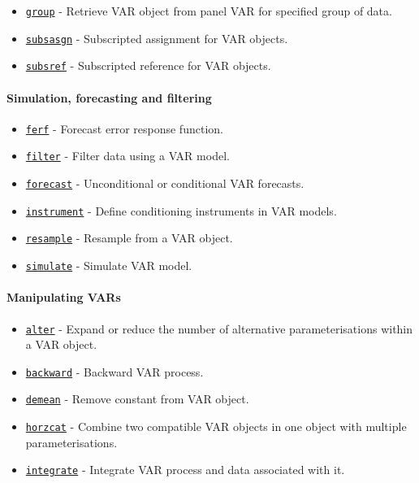 \begin{itemize}
\itemsep1pt\parskip0pt
\item
  \href{VAR/group}{\texttt{group}} - Retrieve VAR object from panel VAR
  for specified group of data.
\item
  \href{VAR/subsasgn}{\texttt{subsasgn}} - Subscripted assignment for
  VAR objects.
\item
  \href{VAR/subsref}{\texttt{subsref}} - Subscripted reference for VAR
  objects.
\end{itemize}

\paragraph{Simulation, forecasting and
filtering}\label{simulation-forecasting-and-filtering}

\begin{itemize}
\itemsep1pt\parskip0pt
\item
  \href{VAR/ferf}{\texttt{ferf}} - Forecast error response function.
\item
  \href{VAR/filter}{\texttt{filter}} - Filter data using a VAR model.
\item
  \href{VAR/forecast}{\texttt{forecast}} - Unconditional or conditional
  VAR forecasts.
\item
  \href{VAR/instrument}{\texttt{instrument}} - Define conditioning
  instruments in VAR models.
\item
  \href{VAR/resample}{\texttt{resample}} - Resample from a VAR object.
\item
  \href{VAR/simulate}{\texttt{simulate}} - Simulate VAR model.
\end{itemize}

\paragraph{Manipulating VARs}\label{manipulating-vars}

\begin{itemize}
\itemsep1pt\parskip0pt
\item
  \href{VAR/alter}{\texttt{alter}} - Expand or reduce the number of
  alternative parameterisations within a VAR object.
\item
  \href{VAR/backward}{\texttt{backward}} - Backward VAR process.
\item
  \href{VAR/demean}{\texttt{demean}} - Remove constant from VAR object.
\item
  \href{VAR/horzcat}{\texttt{horzcat}} - Combine two compatible VAR
  objects in one object with multiple parameterisations.
\item
  \href{VAR/integrate}{\texttt{integrate}} - Integrate VAR process and
  data associated with it.
\end{itemize}

